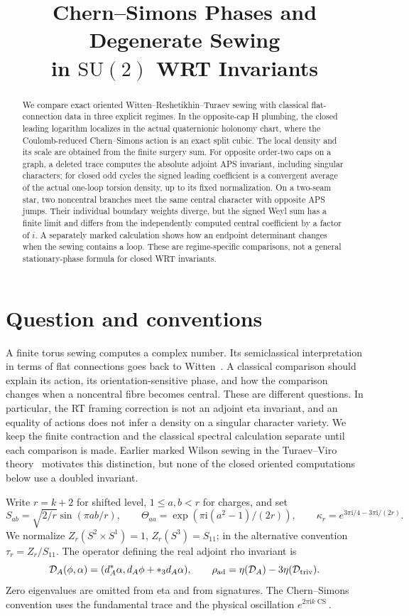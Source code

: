 \documentclass[11pt]{article}
\title{Chern--Simons Phases and Degenerate Sewing\\in \texorpdfstring{$\mathrm{SU}(2)$}{SU(2)} WRT Invariants}
\author{}
\date{}
\theoremstyle{remark}\newtheorem{remark}[theorem]{Remark}
\DeclareMathOperator{\CS}{CS}
\newcommand{\ii}{\mathrm i}
\begin{document}
\maketitle
\begin{abstract}
We compare exact oriented Witten--Reshetikhin--Turaev sewing with classical flat-connection data in three explicit regimes. In the opposite-cap H plumbing, the closed leading logarithm localizes in the actual quaternionic holonomy chart, where the Coulomb-reduced Chern--Simons action is an exact split cubic. The local density and its scale are obtained from the finite surgery sum. For opposite order-two caps on a graph, a deleted trace computes the absolute adjoint APS invariant, including singular characters; for closed odd cycles the signed leading coefficient is a convergent average of the actual one-loop torsion density, up to its fixed normalization. On a two-seam star, two noncentral branches meet the same central character with opposite APS jumps. Their individual boundary weights diverge, but the signed Weyl sum has a finite limit and differs from the independently computed central coefficient by a factor of \(i\). A separately marked calculation shows how an endpoint determinant changes when the sewing contains a loop. These are regime-specific comparisons, not a general stationary-phase formula for closed WRT invariants.
\end{abstract}

\section{Question and conventions}

A finite torus sewing computes a complex number. Its semiclassical interpretation in terms of flat connections goes back to Witten~\cite{Witten}. A classical comparison should explain its action, its orientation-sensitive phase, and how the comparison changes when a noncentral fibre becomes central. These are different questions. In particular, the RT framing correction is not an adjoint eta invariant, and an equality of actions does not infer a density on a singular character variety. We keep the finite contraction and the classical spectral calculation separate until each comparison is made. Earlier marked Wilson sewing in the Turaev--Viro theory~\cite{Paper42B} motivates this distinction, but none of the closed oriented computations below use a doubled invariant.

Write \(r=k+2\) for shifted level, \(1\le a,b<r\) for charges, and set
\[
 S_{ab}=\sqrt{2/r}\sin(\pi ab/r),\qquad
 \Theta_{aa}=\exp(\pi\ii(a^2-1)/(2r)),\qquad
 \kappa_r=e^{3\pi\ii/4-3\pi\ii/(2r)}.
\]
We normalize \(Z_r(S^2\times S^1)=1\), \(Z_r(S^3)=S_{11}\); in the alternative convention \(\tau_r=Z_r/S_{11}\). The operator defining the real adjoint rho invariant is
\[
 {\cal D}_A(\phi,\alpha)=(d_A^*\alpha,d_A\phi+*_3d_A\alpha),
 \qquad \rho_{\rm ad}=\eta({\cal D}_A)-3\eta({\cal D}_{\rm triv}).
\]
Zero eigenvalues are omitted from eta and from signatures. The Chern--Simons convention uses the fundamental trace and the physical oscillation \(e^{2\pi\ii k\CS}\).
\end{document}
